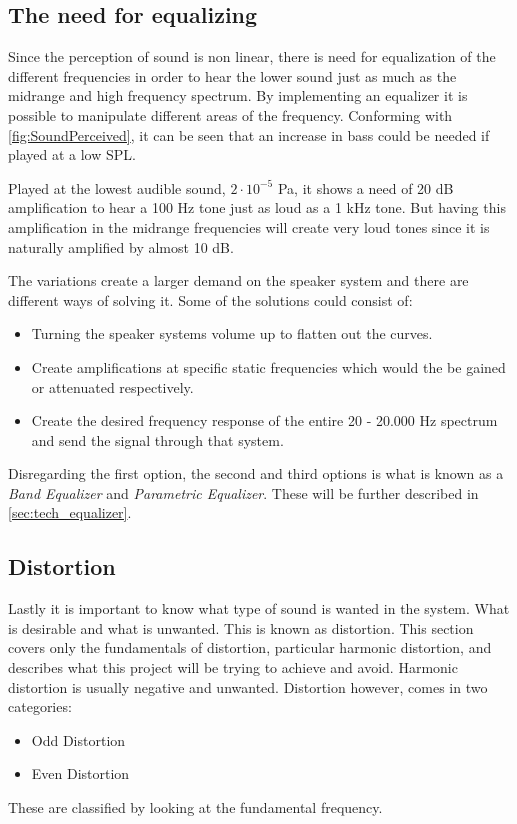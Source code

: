 \subsection{The need for equalizing}

Since the perception of sound is non linear, there is need for equalization of the different frequencies in order to hear the lower sound just as much as the midrange and high frequency spectrum. By implementing an equalizer it is possible to manipulate different areas of the frequency. Conforming with \autoref{fig:SoundPerceived}, it can be seen that an increase in bass could be needed if played at a low \gls{SPL}.

Played at the lowest audible sound, $2\cdot 10^{-5}$ Pa, it shows a need of 20 dB amplification to hear a 100 Hz tone just as loud as a 1 kHz tone. But having this amplification in the midrange frequencies will create very loud tones since it is naturally amplified by almost 10 dB. 

The variations create a larger demand on the speaker system and there are different ways of solving it. Some of the solutions could consist of:

\begin{itemize}
\item Turning the speaker systems volume up to flatten out the curves.
\item Create amplifications at specific static frequencies which would the be gained or attenuated respectively.
\item Create the desired frequency response of the entire 20 - 20.000 Hz spectrum and send the signal through that system.
\end{itemize} 

Disregarding the first option, the second and third options is what is known as a \textit{Band Equalizer} and \textit{Parametric Equalizer}. These will be further described in \autoref{sec:tech_equalizer}.

\subsection{Distortion}

Lastly it is important to know what type of sound is wanted in the system. What is desirable and what is unwanted. This is known as distortion. This section covers only the fundamentals of distortion, particular harmonic distortion, and describes what this project will be trying to achieve and avoid. Harmonic distortion is usually negative and unwanted. Distortion however, comes in two categories:
\begin{itemize}
\item Odd Distortion
\item Even Distortion
\end{itemize}
These are classified by looking at the fundamental frequency. 


